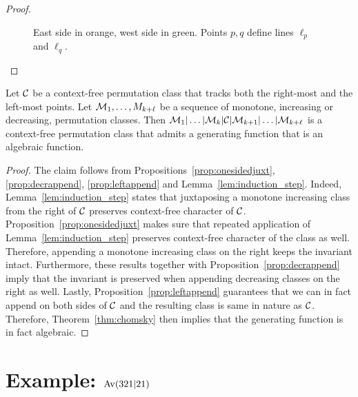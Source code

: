 \documentclass[12pt, a4paper, twoside]{report}
\begin{document}
\begin{proof}
\begin{figure}[!ht]
  \caption{East side in orange, west side in green. Points $p,q$ define lines $\ell_p$ and $\ell_q$.}
  \label{fig:phi_flip}
\end{figure}

\end{proof}


\begin{theorem}
  \label{thm:iterjuxt_main}
  Let $\mathcal{C}$ be a context-free permutation class that tracks both the right-most and the left-most points. Let $\mathcal{M}_1,\ldots,M_{k+\ell}$ be a sequence of monotone, increasing or decreasing, permutation classes. Then $\mathcal{M}_1|\ldots|\mathcal{M}_k|\mathcal{C}|\mathcal{M}_{k+1}|\ldots|\mathcal{M}_{k+\ell}$ is a context-free permutation class that admits a generating function that is an algebraic function.
\end{theorem}
\begin{proof}
  The claim follows from Propositions~\ref{prop:onesidedjuxt}, \ref{prop:decrappend}, \ref{prop:leftappend} and Lemma~\ref{lem:induction_step}. Indeed, Lemma~\ref{lem:induction_step} states that juxtaposing a monotone increasing class from the right of $\mathcal{C}$ preserves context-free character of $\mathcal{C}$. Proposition~\ref{prop:onesidedjuxt} makes sure that repeated application of Lemma~\ref{lem:induction_step} preserves context-free character of the class as well. Therefore, appending a monotone increasing class on the right keeps the invariant intact. Furthermore, these results together with Proposition~\ref{prop:decrappend} imply that the invariant is preserved when appending decreasing classes on the right as well. Lastly, Proposition~\ref{prop:leftappend} guarantees that we can in fact append on both sides of $\mathcal{C}$ and the resulting class is same in nature as $\mathcal{C}$. Therefore, Theorem~\ref{thm:chomsky} then implies that the generating function is in fact algebraic.
\end{proof}


\section{Example: $\mathrm{Av}(321|21)$}
\label{sec:example_Av321Av21}
\end{document}
